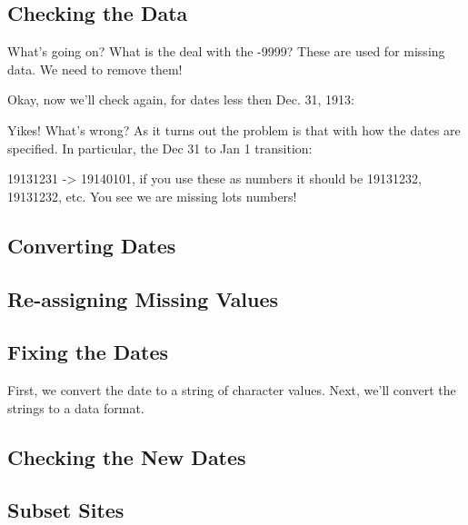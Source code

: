 \documentclass{article}\usepackage[]{graphicx}\usepackage[]{color}
\begin{document}
\subsection{Checking the Data}

What's going on?  What is the deal with the -9999? These are used for missing data. We need to remove them!




Okay, now we'll check again, for dates less then Dec. 31, 1913:




Yikes! What's wrong? As it turns out the problem is that with how the dates are specified. In particular, the Dec 31 to Jan 1 transition: 

19131231 -> 19140101, if you use these as numbers it should be 19131232, 19131232, etc. You see we are missing lots numbers!



\subsection{Converting Dates}

\subsection{Re-assigning Missing Values}

\subsection{Fixing the Dates}

First, we convert the date to a string of character values. Next, we'll convert the strings to a data format. 




\subsection{Checking the New Dates}




\subsection{Subset Sites}
\end{document}
